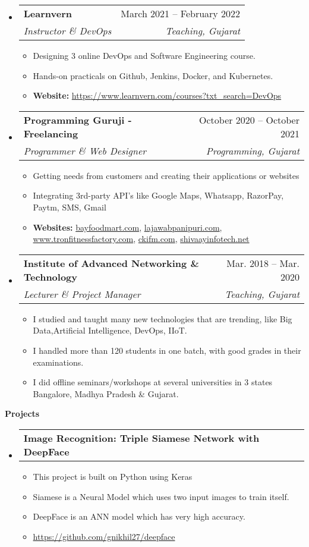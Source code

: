 \documentclass[letterpaper,12pt]{article}[leftmargin=*]
\makeatletter
\def \entryspacing {-0pt}
\renewcommand{\section}[2]{\vspace{5pt}
  \colorbox{secondary}{\color{white}\raggedbottom\normalsize\textbf{{#1}{\hspace{7pt}#2}}}
}
\newcommand{\resumeEntryStart}{\begin{itemize}[leftmargin=2.5mm]}
\newcommand{\resumeEntryEnd}{\end{itemize}\vspace{\entryspacing}}
\newcommand{\resumeItemListStart}{\begin{itemize}[leftmargin=4.5mm]}
\newcommand{\resumeItemListEnd}{\end{itemize}}
\newcommand{\resumeItem}[1]{
  \item\small{
    {#1 \vspace{-2pt}}
  }
}
\newcommand{\resumeEntryTSDL}[4]{
  \vspace{-1pt}\item[]
    \begin{tabularx}{0.97\textwidth}{X@{\hspace{60pt}}r}
      \textbf{\color{primary}#1} & {\firabook\color{accent}\small#2} \\
      \textit{\color{accent}\small#3} & \textit{\color{accent}\small#4} \\
    \end{tabularx}\vspace{-6pt}
}
\newcommand{\resumeEntryTD}[2]{
  \vspace{-1pt}\item[]
    \begin{tabularx}{0.97\textwidth}{X@{\hspace{60pt}}r}
      \textbf{\color{primary}#1} & {\firabook\color{accent}\small#2} \\
    \end{tabularx}\vspace{-6pt}
}
\makeatother
\begin{document}
  \resumeEntryStart
  \resumeEntryTSDL
    {Learnvern}{March 2021 -- February 2022}
    {Instructor \& DevOps}{Teaching, Gujarat}
  \resumeItemListStart
    \resumeItem {Designing 3 online DevOps and Software Engineering course.}
    \resumeItem {Hands-on practicals on Github, Jenkins, Docker, and Kubernetes.}
    \resumeItem {{\bf Website:} \url{https://www.learnvern.com/courses?txt_search=DevOps}}
  \resumeItemListEnd
  \resumeEntryEnd

  \resumeEntryStart
    \resumeEntryTSDL
      {Programming Guruji - Freelancing}{October 2020 -- October 2021}
      {Programmer \& Web Designer}{Programming, Gujarat}
    \resumeItemListStart
      \resumeItem {Getting needs from customers and creating their applications or websites}
      \resumeItem {Integrating 3rd-party API's like Google Maps, Whatsapp, RazorPay, Paytm, SMS, Gmail}
      \resumeItem {{\bf Websites:} \url{bayfoodmart.com}, \space \url{lajawabpanipuri.com}, \space \url{www.tronfitnessfactory.com}, \linebreak 
      \url{ckifm.com}, \space \url{shivaayinfotech.net}}
    \resumeItemListEnd
  \resumeEntryEnd

  \resumeEntryStart
    \resumeEntryTSDL
      {Institute of Advanced Networking \& Technology}{Mar. 2018 -- Mar. 2020}
      {Lecturer \& Project Manager}{Teaching, Gujarat}
    \resumeItemListStart
      \resumeItem { I studied and taught many new technologies that are trending, like Big Data,\linebreak Artificial Intelligence, DevOps, IIoT.}
      \resumeItem{I handled more than 120 students in one batch, with good grades in their examinations.}
      \resumeItem{I did offline seminars/workshops at several universities in 3 states Bangalore, Madhya Pradesh \& Gujarat.}
    \resumeItemListEnd
  \resumeEntryEnd

\pagebreak
\section{\faFlask}{Projects}


\resumeEntryStart
\resumeEntryTD
  {Image Recognition: Triple Siamese Network with DeepFace}{}
\resumeItemListStart
\resumeItem {This project is built on Python using Keras}
  \resumeItem {Siamese is a Neural Model which uses two input images to train itself.}
  \resumeItem {DeepFace is an ANN model which has very high accuracy.}
  \resumeItem {\url{https://github.com/gnikhil27/deepface}}
\resumeItemListEnd
\resumeEntryEnd
\end{document}
